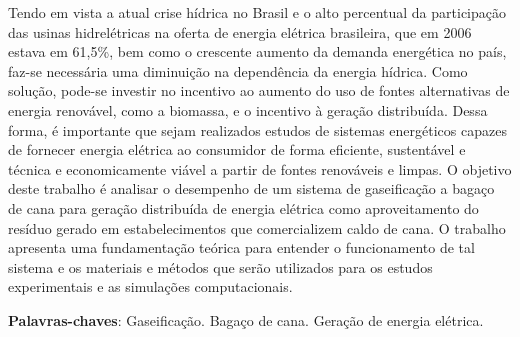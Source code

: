 \begin{resumo}

Tendo em vista a atual crise hídrica no Brasil e o alto percentual da participação das usinas hidrelétricas na oferta de energia elétrica brasileira, que em 2006 estava em 61,5\%, bem como o crescente aumento da demanda energética no país, faz-se necessária uma diminuição na dependência da energia hídrica. Como solução, pode-se investir no incentivo ao aumento do uso de fontes alternativas de energia renovável, como a biomassa, e o incentivo à geração distribuída. Dessa forma, é importante que sejam realizados estudos de sistemas energéticos capazes de fornecer energia elétrica ao consumidor de forma eficiente, sustentável e técnica e economicamente viável a partir de fontes renováveis e limpas. O objetivo deste trabalho é analisar o desempenho de um sistema de gaseificação a bagaço de cana para geração distribuída de energia elétrica como aproveitamento do resíduo gerado em estabelecimentos que comercializem caldo de cana. O trabalho apresenta uma fundamentação teórica para entender o funcionamento de tal sistema e os materiais e métodos que serão utilizados para os estudos experimentais e as simulações computacionais.

 \vspace{\onelineskip}
    
 \noindent
 \textbf{Palavras-chaves}: Gaseificação. Bagaço de cana. Geração de energia elétrica.
\end{resumo}

